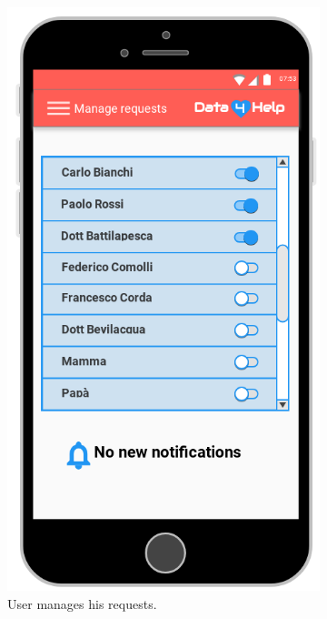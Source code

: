 \begin{figure}[ht]
  \begin{subfigure}[t]{0.38\linewidth}
    \centering
    \includegraphics[width=\linewidth]{images/Mockup/Manage_requests.png}
    \caption{User manages his requests.}
  \end{subfigure} \hfil \hfil \hfil
  \begin{subfigure}[t]{0.38\linewidth}

\end{subfigure}
\end{figure}
